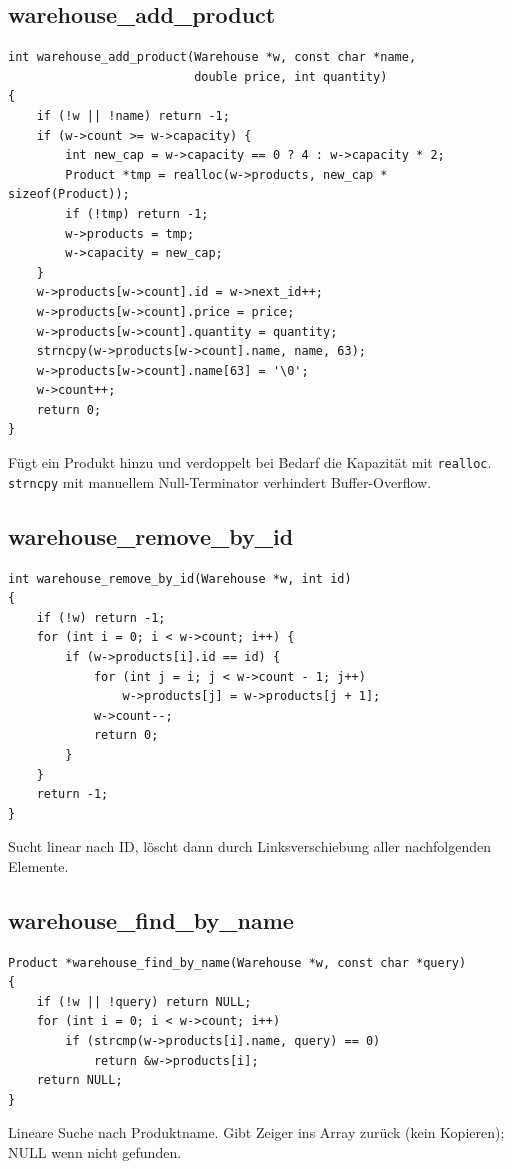 \documentclass[10pt, a4paper]{article}
\begin{document}
\subsection{warehouse\_add\_product}
\begin{lstlisting}
int warehouse_add_product(Warehouse *w, const char *name,
                          double price, int quantity)
{
    if (!w || !name) return -1;
    if (w->count >= w->capacity) {
        int new_cap = w->capacity == 0 ? 4 : w->capacity * 2;
        Product *tmp = realloc(w->products, new_cap * sizeof(Product));
        if (!tmp) return -1;
        w->products = tmp;
        w->capacity = new_cap;
    }
    w->products[w->count].id = w->next_id++;
    w->products[w->count].price = price;
    w->products[w->count].quantity = quantity;
    strncpy(w->products[w->count].name, name, 63);
    w->products[w->count].name[63] = '\0';
    w->count++;
    return 0;
}
\end{lstlisting}
F\"ugt ein Produkt hinzu und verdoppelt bei Bedarf die Kapazit\"at mit \texttt{realloc}. \texttt{strncpy} mit manuellem Null-Terminator verhindert Buffer-Overflow.

\subsection{warehouse\_remove\_by\_id}
\begin{lstlisting}
int warehouse_remove_by_id(Warehouse *w, int id)
{
    if (!w) return -1;
    for (int i = 0; i < w->count; i++) {
        if (w->products[i].id == id) {
            for (int j = i; j < w->count - 1; j++)
                w->products[j] = w->products[j + 1];
            w->count--;
            return 0;
        }
    }
    return -1;
}
\end{lstlisting}
Sucht linear nach ID, l\"oscht dann durch Linksverschiebung aller nachfolgenden Elemente.

\subsection{warehouse\_find\_by\_name}
\begin{lstlisting}
Product *warehouse_find_by_name(Warehouse *w, const char *query)
{
    if (!w || !query) return NULL;
    for (int i = 0; i < w->count; i++)
        if (strcmp(w->products[i].name, query) == 0)
            return &w->products[i];
    return NULL;
}
\end{lstlisting}
Lineare Suche nach Produktname. Gibt Zeiger ins Array zur\"uck (kein Kopieren); NULL wenn nicht gefunden.
\end{document}
